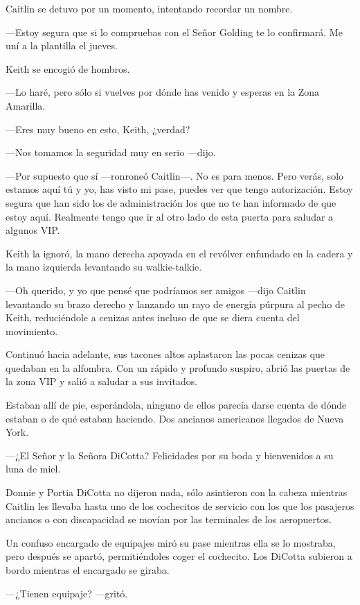 Caitlin se detuvo por un momento, intentando recordar un nombre.

---Estoy segura que si lo compruebas con el Señor Golding te lo
confirmará. Me uní a la plantilla el jueves.

Keith se encogió de hombros.

---Lo haré, pero sólo si vuelves por dónde has venido y esperas en la
Zona Amarilla.

---Eres muy bueno en esto, Keith, ¿verdad?

---Nos tomamos la seguridad muy en serio ---dijo.

---Por supuesto que sí ---ronroneó Caitlin---. No es para menos. Pero
verás, solo estamos aquí tú y yo, has visto mi pase, puedes ver que
tengo autorización. Estoy segura que han sido los de administración los
que no te han informado de que estoy aquí. Realmente tengo que ir al
otro lado de esta puerta para saludar a algunos VIP.

Keith la ignoró, la mano derecha apoyada en el revólver enfundado en la
cadera y la mano izquierda levantando su walkie-talkie.

---Oh querido, y yo que pensé que podríamos ser amigos ---dijo Caitlin
levantando su brazo derecho y lanzando un rayo de energía púrpura al
pecho de Keith, reduciéndole a cenizas antes incluso de que se diera
cuenta del movimiento.

Continuó hacia adelante, sus tacones altos aplastaron las pocas cenizas
que quedaban en la alfombra. Con un rápido y profundo suspiro, abrió las
puertas de la zona VIP y salió a saludar a sus invitados.

Estaban allí de pie, esperándola, ninguno de ellos parecía darse cuenta
de dónde estaban o de qué estaban haciendo. Dos ancianos americanos
llegados de Nueva York.

---¿El Señor y la Señora DiCotta? Felicidades por su boda y bienvenidos
a su luna de miel.

Donnie y Portia DiCotta no dijeron nada, sólo asintieron con la cabeza
mientras Caitlin les llevaba hasta uno de los cochecitos de servicio con
los que los pasajeros ancianos o con discapacidad se movían por las
terminales de los aeropuertos.

Un confuso encargado de equipajes miró su pase mientras ella se lo
mostraba, pero después se apartó, permitiéndoles coger el cochecito. Los
DiCotta subieron a bordo mientras el encargado se giraba.

---¿Tienen equipaje? ---gritó.

